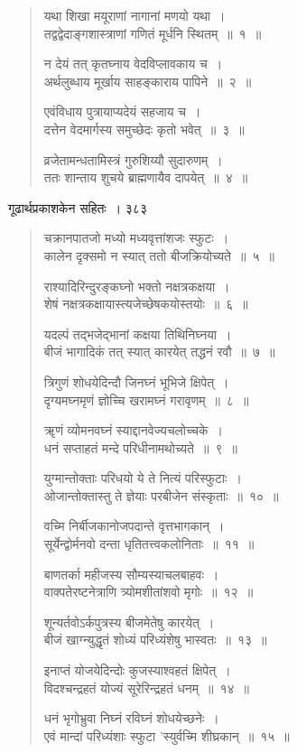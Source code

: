 \documentclass[11pt, openany]{book}
\begin{document}
\begin{quote}
 {\qt यथा शिखा मयूराणां नागानां मणयो यथा~।\\
तद्वद्वेदाङ्गशास्त्राणां गणितं मूर्धनि स्थितम्~॥~१~॥

न देयं तत् कृतघ्नाय वेदविप्लावकाय च~।\\
अर्थलुब्धाय मूर्खाय साहङ्काराय पापिने~॥~२~॥

एवंविधाय पुत्रायाप्यदेयं सहजाय च~।\\
दत्तेन वेदमार्गस्य समुच्छेदः कृतो भवेत्~॥~३~॥

व्रजेतामन्धतामिस्त्रं गुरुशिय्यौ सुदारुणम्~।\\
ततः शान्ताय शुचये ब्राह्मणायैव दापयेत्~॥~४~॥}
\end{quote}



\newpage


\hspace{3cm} गूढार्थप्रकाशकेन सहितः~। \hfill ३८३
\vspace{1cm}



\begin{quote}
 {\qt चक्रानपातजो मध्यो मध्यवृत्तांशजः स्फुटः~।\\
कालेन दृक्समो न स्यात् ततो बीजक्रियोच्यते~॥~५~॥

राश्यादिरिन्दुरङ्कघ्नो भक्तो नक्षत्रकक्षया~।\\
शेषं नक्षत्रकक्षायास्त्यजेच्छेषकयोस्तयोः~॥~६~॥

यदल्पं तद्भजेद्भानां कक्षया तिथिनिघ्नया~।\\
बीजं भागादिकं तत् स्यात् कारयेत् तद्धनं रवौ~॥~७~॥

त्रिगुणं शोधयेदिन्दौ जिनघ्नं भूभिजे क्षिपेत्~।\\
दृग्यमघ्नमृणं ज्ञोच्चि खरामघ्नं गरावृणम्~॥~८~॥

ॠणं व्योमनवघ्नं स्याद्दानवेज्यचलोच्चके~।\\
धनं सप्ताहतं मन्दे परिधीनामथोच्यते~॥~९~॥

युग्मान्तोक्ताः परिधयो ये ते नित्यं परिस्फुटाः~।\\
ओजान्तोक्तास्तु ते ज्ञेयाः परबीजेन संस्कृताः~॥~१०~॥

वच्मि निर्बीजकानोजपदान्ते वृत्तभागकान्~।\\
सूर्येन्द्वोर्मनवो दन्ता धृतितत्त्वकलोनिताः~॥~११~॥

बाणतर्का महीजस्य सौम्यस्याचलबाहवः~।\\
वाक्पतेरष्टनेत्राणि त्र्योमशीतांशवो मृगोः~॥~१२~॥

शून्यर्तवोऽर्कपुत्रस्य बीजमेतेषु कारयेत्~।\\
बीजं खाग्न्युद्धृतं शोध्यं परिध्यंशेषु भास्वतः~॥~१३~॥

इनाप्तं योजयेदिन्दोः कुजस्याश्वहतं क्षिपेत्~।\\
विदश्चन्द्रहतं योज्यं सूरेरिन्द्रहतं धनम्~॥~१४~॥

धनं भृगोभ्रुवा निघ्नं रविघ्नं शोधयेच्छनेः~।\\
एवं मान्दां परिध्यंशाः स्फुटा 'स्युर्वच्मि शीघ्रकान्~॥~१५~॥}
\end{quote}
\end{document}
